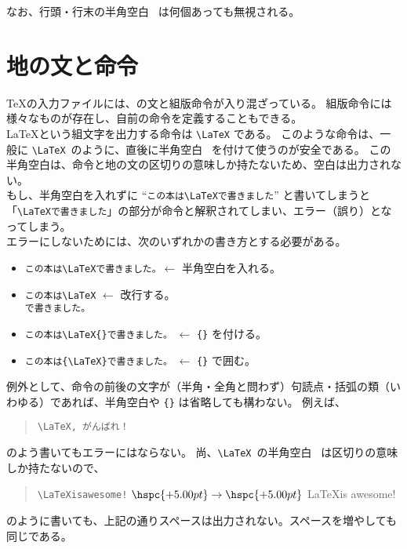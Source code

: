 なお、行頭・行末の半角空白 \textvisiblespace\ は何個あっても無視される。
\section{地の文と命令}
\TeX{}の入力ファイルには、の文と組版命令が入り混ざっている。
組版命令には様々なものが存在し、自前の命令を定義することもできる。\\

\LaTeX{}という組文字を出力する命令は \verb'\LaTeX' である。
このような命令は、一般に \verb'\LaTeX'\textvisiblespace\ のように、直後に半角空白 \textvisiblespace\ を付けて使うのが安全である。
この半角空白は、命令と地の文の区切りの意味しか持たないため、空白は出力されない。\\

もし、半角空白を入れずに ``\verb|この本は\LaTeXで書きました|'' と書いてしまうと「\verb|\LaTeXで書きました|」の部分が命令と解釈されてしまい、エラー（誤り）となってしまう。\\

エラーにしないためには、次のいずれかの書き方とする必要がある。
\begin{itemize}\setlength{\leftskip}{-1.00zw}%
\item \verb'この本は\LaTeX'\textvisiblespace\hspc{-02pt}\verb'で書きました。'$\leftarrow$ 半角空白を入れる。
\item \verb'この本は\LaTeX'                                      $\leftarrow$ 改行する。\\\verb'で書きました。'
\item \verb'この本は\LaTeX{}で書きました。'                                  $\leftarrow$ \verb'{}' を付ける。
\item \verb'この本は{\LaTeX}で書きました。'                                  $\leftarrow$ \verb'{}' で囲む。
\end{itemize}
例外として、命令の前後の文字が（半角・全角と問わず）句読点・括弧の類（いわゆる）であれば、半角空白や \verb'{}' は省略しても構わない。
例えば、
\begin{quote}
  \verb'\LaTeX, がんばれ！'
\end{quote}
のよう書いてもエラーにはならない。
尚、\verb'\LaTeX'\textvisiblespace\ の半角空白 \textvisiblespace\ は区切りの意味しか持たないので、
\begin{quote}
  \verb'\LaTeX'\textvisiblespace\textvisiblespace\textvisiblespace\textvisiblespace\textvisiblespace\textvisiblespace\verb'is'\textvisiblespace\verb'awesome!' $\hspc{+5.00pt}\rightarrow\hspc{+5.00pt}$ \LaTeX{}is awesome!
\end{quote}
のように書いても、上記の通りスペースは出力されない。スペースを増やしても同じである。\\

